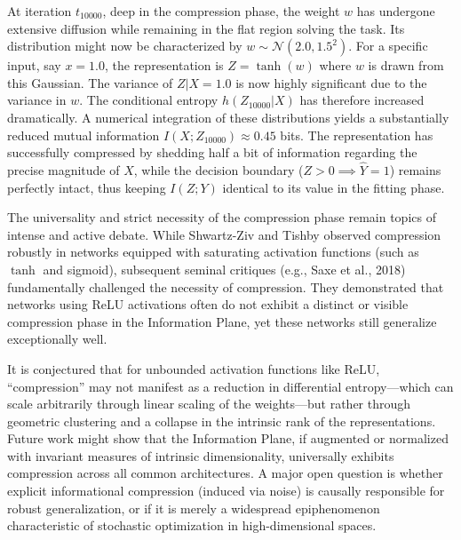 At iteration $t_{10000}$, deep in the compression phase, the weight $w$ has undergone extensive diffusion while remaining in the flat region solving the task. Its distribution might now be characterized by $w \sim \mathcal{N}(2.0, 1.5^2)$.
For a specific input, say $x=1.0$, the representation is $Z = \tanh(w)$ where $w$ is drawn from this Gaussian. The variance of $Z|X=1.0$ is now highly significant due to the variance in $w$. The conditional entropy $h(Z_{10000}|X)$ has therefore increased dramatically. A numerical integration of these distributions yields a substantially reduced mutual information $I(X; Z_{10000}) \approx 0.45$ bits. The representation has successfully compressed by shedding half a bit of information regarding the precise magnitude of $X$, while the decision boundary ($Z > 0 \implies \hat{Y} = 1$) remains perfectly intact, thus keeping $I(Z; Y)$ identical to its value in the fitting phase.

\begin{horizon}
The universality and strict necessity of the compression phase remain topics of intense and active debate. While Shwartz-Ziv and Tishby observed compression robustly in networks equipped with saturating activation functions (such as $\tanh$ and sigmoid), subsequent seminal critiques (e.g., Saxe et al., 2018) fundamentally challenged the necessity of compression. They demonstrated that networks using ReLU activations often do not exhibit a distinct or visible compression phase in the Information Plane, yet these networks still generalize exceptionally well.

It is conjectured that for unbounded activation functions like ReLU, ``compression'' may not manifest as a reduction in differential entropy---which can scale arbitrarily through linear scaling of the weights---but rather through geometric clustering and a collapse in the intrinsic rank of the representations. Future work might show that the Information Plane, if augmented or normalized with invariant measures of intrinsic dimensionality, universally exhibits compression across all common architectures. A major open question is whether explicit informational compression (induced via noise) is causally responsible for robust generalization, or if it is merely a widespread epiphenomenon characteristic of stochastic optimization in high-dimensional spaces.
\end{horizon}

